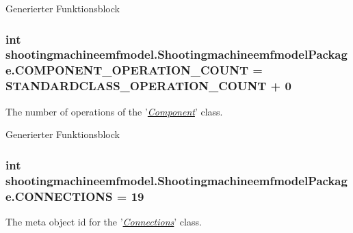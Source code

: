 Generierter Funktionsblock  \hypertarget{interfaceshootingmachineemfmodel_1_1_shootingmachineemfmodel_package_acec1e36886a6e79a88055810db488d36}{
\subsubsection[{C\-O\-M\-P\-O\-N\-E\-N\-T\-\_\-\-O\-P\-E\-R\-A\-T\-I\-O\-N\-\_\-\-C\-O\-U\-N\-T}]{\setlength{\rightskip}{0pt plus 5cm}int shootingmachineemfmodel.\-Shootingmachineemfmodel\-Package.\-C\-O\-M\-P\-O\-N\-E\-N\-T\-\_\-\-O\-P\-E\-R\-A\-T\-I\-O\-N\-\_\-\-C\-O\-U\-N\-T = {\bf S\-T\-A\-N\-D\-A\-R\-D\-C\-L\-A\-S\-S\-\_\-\-O\-P\-E\-R\-A\-T\-I\-O\-N\-\_\-\-C\-O\-U\-N\-T} + 0}}\label{interfaceshootingmachineemfmodel_1_1_shootingmachineemfmodel_package_acec1e36886a6e79a88055810db488d36}
The number of operations of the '{\itshape \hyperlink{interfaceshootingmachineemfmodel_1_1_component}{Component}}' class.

Generierter Funktionsblock  \hypertarget{interfaceshootingmachineemfmodel_1_1_shootingmachineemfmodel_package_a8a76dc627f9336bbd84e2f73057f5f54}{
\subsubsection[{C\-O\-N\-N\-E\-C\-T\-I\-O\-N\-S}]{\setlength{\rightskip}{0pt plus 5cm}int shootingmachineemfmodel.\-Shootingmachineemfmodel\-Package.\-C\-O\-N\-N\-E\-C\-T\-I\-O\-N\-S = 19}}\label{interfaceshootingmachineemfmodel_1_1_shootingmachineemfmodel_package_a8a76dc627f9336bbd84e2f73057f5f54}
The meta object id for the '\hyperlink{classshootingmachineemfmodel_1_1impl_1_1_connections_impl}{{\itshape Connections}}' class.

